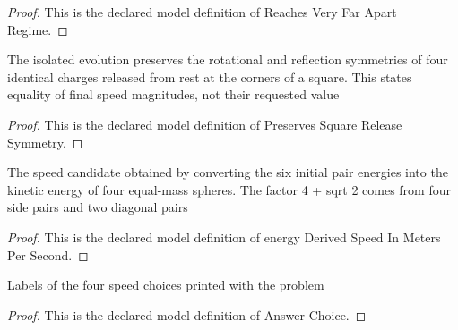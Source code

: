 \begin{proof}
  This is the declared model definition of Reaches Very Far Apart Regime.
\end{proof}
\begin{definition}
  \label{def:physics:phyx-mini-0864:phyxminiproblems-problemphyxmini0864-preservessquarereleasesymmetry}
  The isolated evolution preserves the rotational and reflection symmetries of four identical charges released from rest at the corners of a square. This states equality of final speed magnitudes, not their requested value
\end{definition}
\begin{proof}
  This is the declared model definition of Preserves Square Release Symmetry.
\end{proof}
\begin{definition}
  \label{def:physics:phyx-mini-0864:phyxminiproblems-problemphyxmini0864-energyderivedspeedinmeterspersecond}
  The speed candidate obtained by converting the six initial pair energies into the kinetic energy of four equal-mass spheres. The factor 4 + sqrt 2 comes from four side pairs and two diagonal pairs
\end{definition}
\begin{proof}
  This is the declared model definition of energy Derived Speed In Meters Per Second.
\end{proof}
\begin{definition}
  \label{def:physics:phyx-mini-0864:phyxminiproblems-problemphyxmini0864-answerchoice}
  Labels of the four speed choices printed with the problem
\end{definition}
\begin{proof}
  This is the declared model definition of Answer Choice.
\end{proof}
